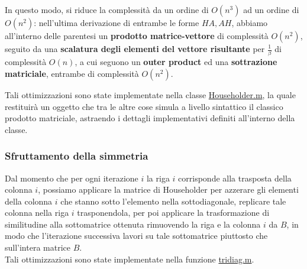 In questo modo, si riduce la complessità da un ordine di $O(n^3)$ ad un ordine 
di $O(n^2)$: nell'ultima derivazione di entrambe le forme $HA, AH$, abbiamo 
all'interno delle parentesi un \textbf{prodotto matrice-vettore} di complessità 
$O(n^2)$, seguito da una \textbf{scalatura degli elementi del vettore 
risultante} per $\frac{1}{\beta}$ di complessità $O(n)$, a cui seguono un 
\textbf{outer product} ed una \textbf{sottrazione matriciale}, entrambe di 
complessità $O(n^2)$.

Tali ottimizzazioni sono state implementate nella classe 
\href{https://github.com/Yagotzirck/svd_benchmark/blob/main/src/Householder.m}{Householder.m}, 
la quale restituirà un oggetto che tra le altre cose simula a livello sintattico 
il classico prodotto matriciale, astraendo i dettagli implementativi definiti 
all'interno della classe.

\subsubsection{Sfruttamento della simmetria}
Dal momento che per ogni iterazione $i$ la riga $i$ corrisponde alla trasposta 
della colonna $i$, possiamo applicare la matrice di Householder per azzerare gli 
elementi della colonna $i$ che stanno sotto l'elemento nella sottodiagonale, 
replicare tale colonna nella riga $i$ trasponendola, per poi applicare la 
trasformazione di similitudine alla sottomatrice ottenuta rimuovendo la riga e 
la colonna $i$ da $B$, in modo che l'iterazione successiva lavori su tale 
sottomatrice piuttosto che sull'intera matrice $B$. \\

Tali ottimizzazioni sono state implementate nella funzione 
\href{https://github.com/Yagotzirck/svd_benchmark/blob/main/src/tridiag.m}{tridiag.m}.


